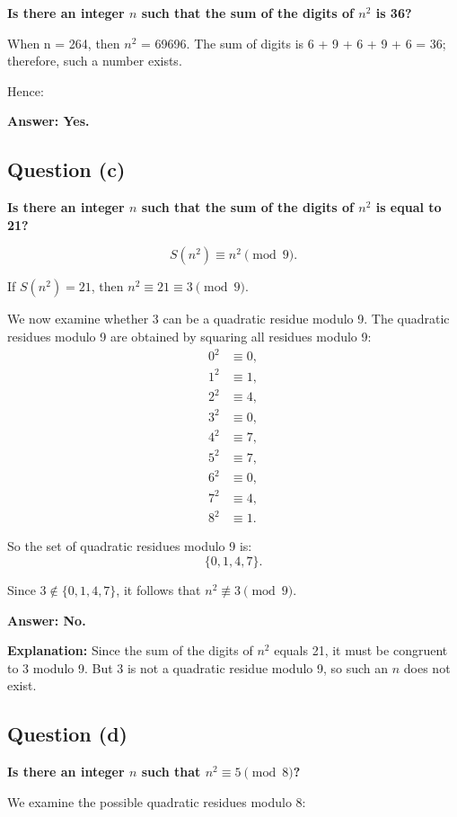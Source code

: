 \documentclass[12pt]{article}
\begin{document}
\textbf{Is there an integer \( n \) such that the sum of the digits of \( n^2 \) is 36?}

When n = 264, then \( n^2 \) = 69696. The sum of digits is 6 + 9 + 6 + 9 + 6 = 36; therefore, such a number exists.

Hence:

\textbf{Answer: Yes.}

\subsection{Question (c)}

\textbf{Is there an integer \( n \) such that the sum of the digits of \( n^2 \) is equal to 21?}

\[
S(n^2) \equiv n^2 \pmod{9}.
\]

If \( S(n^2) = 21 \), then \( n^2 \equiv 21 \equiv 3 \pmod{9} \).

We now examine whether 3 can be a quadratic residue modulo 9. The quadratic residues modulo 9 are obtained by squaring all residues modulo 9:
\[
\begin{aligned}
0^2 &\equiv 0, \\
1^2 &\equiv 1, \\
2^2 &\equiv 4, \\
3^2 &\equiv 0, \\
4^2 &\equiv 7, \\
5^2 &\equiv 7, \\
6^2 &\equiv 0, \\
7^2 &\equiv 4, \\
8^2 &\equiv 1.
\end{aligned}
\]

So the set of quadratic residues modulo 9 is:
\[
\{0, 1, 4, 7\}.
\]

Since \( 3 \not\in \{0, 1, 4, 7\} \), it follows that \( n^2 \not\equiv 3 \pmod{9} \).

\textbf{Answer: No.}

\textbf{Explanation:} Since the sum of the digits of \( n^2 \) equals 21, it must be congruent to 3 modulo 9. But 3 is not a quadratic residue modulo 9, so such an \( n \) does not exist.

\subsection{Question (d)}

\textbf{Is there an integer \( n \) such that \( n^2 \equiv 5 \pmod{8} \)?}

We examine the possible quadratic residues modulo 8:
\end{document}
